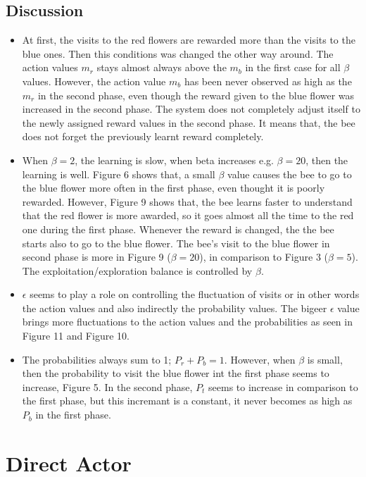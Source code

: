 \documentclass{article}
\begin{document}
\subsection{Discussion}
\begin{itemize}
 \item At first, the visits to the red flowers are rewarded more than the visits to the blue ones. Then this conditions was changed the other way around. The action values $m_r$ stays almost always above the $m_b$ in the first case for all $\beta$ values. However, the action value $m_b$ has been never observed as high as the $m_r$ in the second phase, even though the reward given to the blue flower was increased in the second phase. The system does not completely adjust itself to the newly assigned reward values in the second phase. It means that, the bee does not forget the previously learnt reward completely. 
\item When $\beta=2$, the learning is slow, when beta increases e.g. $\beta=20$, then the learning is well. Figure 6 shows that, a small $\beta$ value causes the bee to go to the blue flower more often in the first phase, even thought it is poorly rewarded. However, Figure 9 shows that, the bee learns faster to understand that the red flower is more awarded, so it goes almost all the time to the red one during the first phase. Whenever the reward is changed, the the bee starts also to go to the blue flower. The bee's visit to the blue flower in second phase is more in Figure 9 ($\beta=20$), in comparison to Figure 3 ($\beta=5$). The exploitation/exploration balance is controlled by $\beta$.
\item $\epsilon$ seems to play a role on controlling the fluctuation of visits or in other words the action values and also indirectly the probability values. The bigeer $\epsilon$ value brings more fluctuations to the action values and the probabilities as seen in Figure 11 and Figure 10. 
\item The probabilities always sum to 1; $P_r+P_b=1$. However, when $\beta$ is small, then the probability to visit the blue flower int the first phase seems to increase, Figure 5. In the second phase, $P_t$ seems to increase in comparison to the first phase, but this incremant is a constant, it never becomes as high as $P_b$ in the first phase.
\end{itemize}

\section{Direct Actor}
\end{document}
